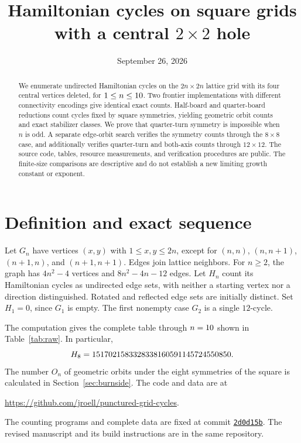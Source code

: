 \documentclass[12pt]{amsart}
\title[Hamiltonian cycles with a central hole]{Hamiltonian cycles on square grids\protect\\with a central $2\times2$ hole}
\date{September 26, 2026}
\begin{document}
\begin{abstract}
We enumerate undirected Hamiltonian cycles on the $2n\times2n$ lattice grid
with its four central vertices deleted, for $1\leq n\leq10$.
Two frontier implementations with different connectivity encodings give
identical exact counts. Half-board and quarter-board reductions count cycles
fixed by square symmetries, yielding geometric orbit counts and exact
stabilizer classes. We prove that quarter-turn symmetry is impossible when
$n$ is odd. A separate edge-orbit search verifies the symmetry counts
through the $8\times8$ case, and additionally verifies quarter-turn and
both-axis counts through $12\times12$. The source code, tables, resource measurements,
and verification procedures are public. The finite-size comparisons are
descriptive and do not establish a new limiting growth constant or exponent.
\end{abstract}
\maketitle

\section{Definition and exact sequence}
Let $G_n$ have vertices $(x,y)$ with $1\leq x,y\leq2n$, except for
$(n,n)$, $(n,n+1)$, $(n+1,n)$, and $(n+1,n+1)$.
Edges join lattice neighbors. For $n\geq2$, the graph has $4n^2-4$ vertices
and $8n^2-4n-12$ edges. Let $H_n$ count its Hamiltonian cycles as undirected
edge sets, with neither a starting vertex nor a direction distinguished.
Rotated and reflected edge sets are initially distinct. Set $H_1=0$,
since $G_1$ is empty. The first nonempty case $G_2$ is a single $12$-cycle.

\begin{table}[htbp]
\centering

\caption{Undirected Hamiltonian cycles on the centrally punctured grid.}
\label{tab:raw}
\end{table}

The computation gives the complete table through $n=10$ shown in
Table~\ref{tab:raw}. In particular,
\[
H_8=1517021583328338160591145724550850.
\]
The number $O_n$ of geometric orbits under the eight symmetries of the square
is calculated in Section~\ref{sec:burnside}. The code and data are at
\begin{center}
\url{https://github.com/jroell/punctured-grid-cycles}.
\end{center}
The counting programs and complete data are fixed at commit
\href{https://github.com/jroell/punctured-grid-cycles/tree/2d0d15baa21d21f9436bcf5736be4969a0ad818f}{\texttt{2d0d15b}}. The revised manuscript and its build instructions
are in the same repository.
\end{document}
